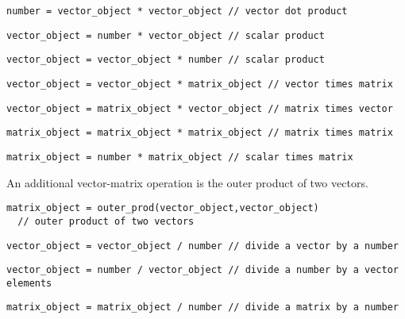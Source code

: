 \documentclass{admbmanual}
\begin{document}
\begin{lstlisting}
number = vector_object * vector_object // vector dot product 
\end{lstlisting}
\begin{lstlisting}
vector_object = number * vector_object // scalar product 
\end{lstlisting}
\begin{lstlisting}
vector_object = vector_object * number // scalar product 
\end{lstlisting}
\begin{lstlisting}
vector_object = vector_object * matrix_object // vector times matrix 
\end{lstlisting}
\begin{lstlisting}
vector_object = matrix_object * vector_object // matrix times vector 
\end{lstlisting}
\begin{lstlisting}
matrix_object = matrix_object * matrix_object // matrix times matrix 
\end{lstlisting}
\begin{lstlisting}
matrix_object = number * matrix_object // scalar times matrix 
\end{lstlisting}
An additional vector-matrix operation is the outer product of two vectors.
\begin{lstlisting}
matrix_object = outer_prod(vector_object,vector_object) 
  // outer product of two vectors
\end{lstlisting}


\begin{lstlisting}
vector_object = vector_object / number // divide a vector by a number
\end{lstlisting}
\begin{lstlisting}
vector_object = number / vector_object // divide a number by a vector elements
\end{lstlisting}
\begin{lstlisting}
matrix_object = matrix_object / number // divide a matrix by a number
\end{lstlisting}
\end{document}
